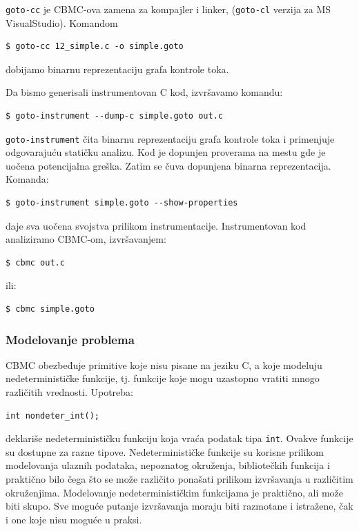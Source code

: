 \texttt{goto-cc} je CBMC-ova zamena za kompajler i linker, (\texttt{goto-cl} verzija za MS VisualStudio). Komandom

\begin{verbatim}
$ goto-cc 12_simple.c -o simple.goto
\end{verbatim}

dobijamo binarnu reprezentaciju grafa kontrole toka.

Da bismo generisali instrumentovan C kod, izvršavamo komandu:

\begin{verbatim}
$ goto-instrument --dump-c simple.goto out.c
\end{verbatim}

\texttt{goto-instrument} čita binarnu reprezentaciju grafa kontrole toka i primenjuje odgovarajuću statičku analizu. Kod je dopunjen proverama na mestu gde je uočena potencijalna greška. Zatim se čuva dopunjena binarna reprezentacija. Komanda:

\begin{verbatim}
$ goto-instrument simple.goto --show-properties
\end{verbatim}

daje sva uočena svojstva prilikom instrumentacije. Instrumentovan kod analiziramo CBMC-om, izvršavanjem:

\begin{verbatim}
$ cbmc out.c
\end{verbatim}

ili:

\begin{verbatim}
$ cbmc simple.goto
\end{verbatim}

\subsubsection{Modelovanje problema}\label{modelovanje-problema}

CBMC obezbeđuje primitive koje nisu pisane na jeziku C, a koje modeluju nedeterminističke funkcije, tj. funkcije koje mogu uzastopno vratiti mnogo različitih vrednosti. Upotreba:

\begin{verbatim}
int nondeter_int();
\end{verbatim}

deklariše nedeterminističku funkciju koja vraća podatak tipa \texttt{int}. Ovakve funkcije su dostupne za razne tipove. Nedeterminističke funkcije su korisne prilikom modelovanja ulaznih podataka, nepoznatog okruženja, bibliotečkih funkcija i praktično bilo čega što se može različito ponašati prilikom izvršavanja u različitim okruženjima. Modelovanje nedeterminističkim funkcijama je praktično, ali može biti skupo. Sve moguće putanje izvršavanja moraju biti razmotane i istražene, čak i one koje nisu moguće u praksi.

